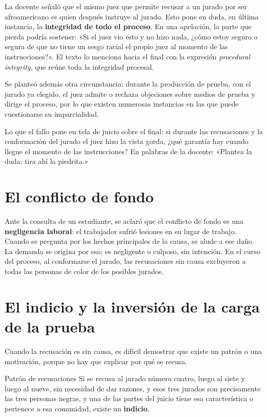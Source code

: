 \documentclass[12pt,oneside]{book}
\begin{document}
La docente señaló que el mismo juez que permite recusar a un jurado por ser afroamericano es quien después instruye al jurado. Esto pone en duda, en última instancia, la \textbf{integridad de todo el proceso}. En una apelación, la parte que pierda podría sostener: «Si el juez vio esto y no hizo nada, ¿cómo estoy seguro o segura de que no tiene un sesgo racial el propio juez al momento de las instrucciones?». El texto lo menciona hacia el final con la expresión \textit{procedural integrity}, que reúne toda la integridad procesal.

Se planteó además otra circunstancia: durante la producción de prueba, con el jurado ya elegido, el juez admite o rechaza objeciones sobre medios de prueba y dirige el proceso, por lo que existen numerosas instancias en las que puede cuestionarse su imparcialidad.

\begin{note}
Lo que el fallo pone en tela de juicio sobre el final: si durante las recusaciones y la conformación del jurado el juez hizo la vista gorda, ¿qué garantía hay cuando llegue el momento de las instrucciones? En palabras de la docente: «Plantea la duda; tira ahí la piedrita.»
\end{note}

\section{El conflicto de fondo}

Ante la consulta de un estudiante, se aclaró que el conflicto de fondo es una \textbf{negligencia laboral}: el trabajador sufrió lesiones en su lugar de trabajo. Cuando se pregunta por los hechos principales de la causa, se alude a ese daño. La demanda se origina por eso; es negligente o culposo, sin intención. En el curso del proceso, al conformarse el jurado, las recusaciones sin causa excluyeron a todas las personas de color de los posibles jurados.

\section{El indicio y la inversión de la carga de la prueba}

Cuando la recusación es sin causa, es difícil demostrar que existe un patrón o una motivación, porque no hay que explicar por qué se recusa.

\begin{example}{Patrón de recusaciones}
Si se recusa al jurado número cuatro, luego al siete y luego al nueve, sin necesidad de dar razones, y esos tres jurados son precisamente las tres personas negras, y una de las partes del juicio tiene esa característica o pertenece a esa comunidad, existe un \textbf{indicio}.
\end{example}
\end{document}
